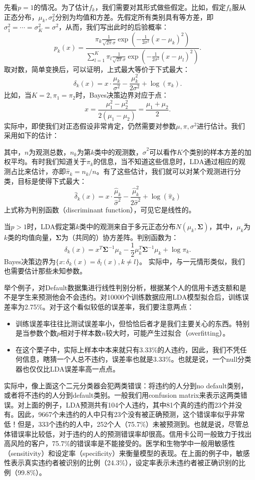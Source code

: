\documentclass[hyperref,]{ctexart}
\providecommand{\tightlist}{%
  \setlength{\itemsep}{0pt}\setlength{\parskip}{0pt}}
\begin{document}
先看\(p=1\)的情况。为了估计\(f_k\)，我们需要对其形式做些假定。比如，假定\(f_k\)服从正态分布，\(\mu_k,\sigma^2_k\)分别为均值和方差。先假定所有类别具有等方差，即\(\sigma^2_1=\cdots=\sigma^2_K=\sigma^2\)，从而，我们写出此时的后验概率：
\[p_k(x)=\frac{\pi_k \frac{1}{\sqrt{2\pi}\sigma}\exp\left(-\frac{1}{2\sigma^2}(x-\mu_k)^2\right)}{\sum_{l=1}^{K} \pi_l \frac{1}{\sqrt{2\pi}\sigma}\exp\left(-\frac{1}{2\sigma^2}(x-\mu_l)^2\right)}.\]
取对数，简单变换后，可以证明，上式最大等价于下式最大：
\[\delta_k(x)=x\cdot\frac{\mu_k}{\sigma^2}-\frac{\mu_k^2}{2\sigma^2}+\log(\pi_k).\]
比如，当\(K=2,\pi_1=\pi_2\)时，Bayes决策边界对应于点：
\[x=\frac{\mu_1^2-\mu_2^2}{2(\mu_1-\mu_2)}=\frac{\mu_1+\mu_2}{2}.\]
实际中，即使我们对正态假设非常肯定，仍然需要对参数\(\mu,\pi,\sigma^2\)进行估计。我们采用如下的估计：

其中，\(n\)为观测总数，\(n_k\)为第\(k\)类中的观测数，\(\hat{\sigma}^2\)可以看作\(K\)个类别的样本方差的加权平均。有时我们知道关于\(\pi_k\)的信息，当不知道这些信息时，LDA通过相应的观测占比来估计，亦即\(\hat{\pi}_k=n_k/n\)。有了这些估计，我们就可以对某个观测进行分类，目标是使得下式最大：
\[\hat{\delta}_k(x)=x\cdot\frac{\hat{\mu}_k}{\hat{\sigma}^2}-\frac{\hat{\mu}_k^2}{2\hat{\sigma}^2}+\log(\hat{\pi}_k)\]
上式称为判别函数（discriminant function），可见它是线性的。

当\(p>1\)时，LDA假定第\(k\)类中的观测来自于多元正态分布\(N(\mu_k,\mathbf{\Sigma})\)，其中，\(\mu_k\)为\(k\)类的均值向量，\(\mathbf{\Sigma}\)为（共同的）协方差阵。判别函数为：
\[\delta_k(x)=x^{T}\mathbf{\Sigma}^{-1}\mu_k-\frac{1}{2}\mu_k^T\mathbf{\Sigma}^{-1}\mu_k+\log\pi_k.\]
Bayes决策边界为\(\{x:\delta_k(x)=\delta_l(x),k\neq l\}\)。
实际中，与一元情形类似，我们也需要估计那些未知参数。

举个例子，对Default数据集进行线性判别分析，根据某个人的信用卡透支额和是不是学生来预测他会不会违约。对10000个训练数据应用LDA模型拟合后，训练误差率为2.75\%。对于这个看似较低的误差率，我们要注意两点：

\begin{itemize}
\tightlist
\item
  训练误差率往往比测试误差率小，但恰恰后者才是我们主要关心的东西。特别是当参数个数\(p\)相对于样本数\(n\)较大时，可能产生过拟合（overfitting）。
\item
  在这个栗子中，实际上样本中本来就只有3.33\%的人违约，因此，我们不凭任何信息，瞎猜一个人总不违约，误差率也就是3.33\%。也就是说，一个null分类器也仅仅比LDA误差率高一点点。
\end{itemize}

实际中，像上面这个二元分类器会犯两类错误：将违约的人分到no
default类别，或者将不违约的人分到default类别。一般我们用confusion
matrix来表示这两类错误。对上面的例子，LDA预测共有104个人违约，其中81个真的违约而23个并没有。因此，9667个未违约的人中只有23个没有被正确预测，这个错误率似乎非常低！但是，333个违约的人中，252个人（75.7\%）未被预测到。也就是说，尽管总体错误率比较低，对于违约的人的预测错误率却很高。信用卡公司一般致力于找出高风险的客户，75.7\%的错误率是不能接受的。医学和生物学中一般用敏感性（sensitivity）和设定率（specificity）来衡量模型的表现。在上面的例子中，敏感性表示真实违约者被识别的比例（24.3\%），设定率表示未违约者被正确识别的比例（99.8\%）。
\end{document}
